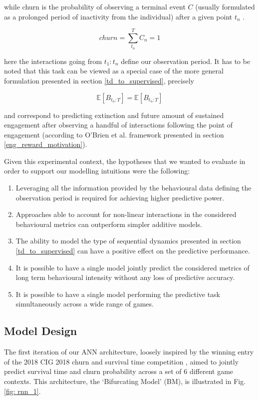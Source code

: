 while churn is the probability of observing a terminal event $C$ (usually formulated as a prolonged period of inactivity from the individual) after a given point $t_n$ \cite{hadiji2014predicting,runge2014churn, drachen2016rapid,milovsevic2017early, kim2017churn}.

\begin{equation}
\label{eq_churn}
    churn = \sum_{t_n}^{T}C_n = 1
\end{equation}

here the interactions going from $t_1: t_n$ define our observation period. It has to be noted that this task can be viewed as a special case of the more general formulation presented in section \ref{td_to_supervised}, precisely 

\begin{equation}
\label{rnn_1_exp}
   \mathbb{E}[B_{t_n : T}] = \mathbb{E}[B_{t_n : T}]
\end{equation}

and correspond to predicting extinction and future amount of sustained engagement after observing a handful of interactions following the point of engagement (according to O'Brien et al. \cite{o2008user} framework presented in section \ref{eng_reward_motivation}). 

Given this experimental context, the hypotheses that we wanted to evaluate in order to support our modelling intuitions were the following:
\begin{enumerate}
    \item Leveraging all the information provided by the behavioural data defining the observation period is required for achieving higher predictive power.
    \item Approaches able to account for non-linear interactions in the considered behavioural metrics can outperform simpler additive models.
    \item The ability to model the type of sequential dynamics presented in section \ref{td_to_supervised} can have a positive effect on the predictive performance.
    \item It is possible to have a single model jointly predict the considered metrics of long term behavioural intensity without any loss of predictive accuracy.
    \item It is possible to have a single model performing the predictive task simultaneously across a wide range of games.
\end{enumerate}

\subsection{Model Design}
\label{model_design_1}
The first iteration of our ANN architecture, loosely inspired by the winning entry  of the 2018 CIG 2018 churn and survival time competition \cite{lee2018game}, aimed to jointly predict survival time and churn probability across a set of 6 different game contexts. This architecture, the `Bifurcating Model' (BM), is illustrated in Fig. \ref{fig: rnn_1}. 


